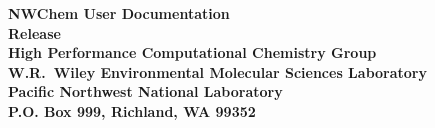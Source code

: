 
\begin{titlepage}

\begin{centering}


{\bf\Huge NWChem User Documentation}\\[0.5in] 
{\bf\Huge Release \nwchemversion}\\[1.0in]

{\bf\Large High Performance Computational Chemistry Group\\
    W.R.\ Wiley Environmental Molecular Sciences Laboratory\\
    Pacific Northwest National Laboratory\\
    P.O. Box 999, Richland, WA 99352\\[0.5in]}

{\bf\Large \nwchemmonth \ \nwchemyear}\\[1.0in]




\end{centering}

\end{titlepage}
